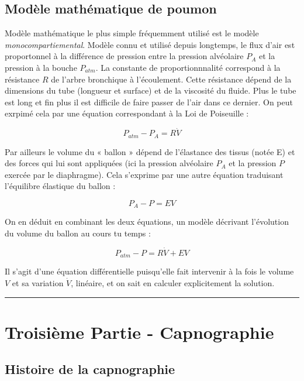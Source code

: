 \documentclass[12pt,]{article}
\begin{document}
\hypertarget{moduxe8le-mathuxe9matique-de-poumon}{%
\subsection{Modèle mathématique de
poumon}\label{moduxe8le-mathuxe9matique-de-poumon}}

Modèle mathématique le plus simple fréquemment utilisé est le modèle
\emph{monocompartiemental}. Modèle connu et utilisé depuis longtemps, le
flux d'air est proportonnel à la différence de pression entre la
pression alvéolaire \(P_{A}\) et la pression à la bouche \(P_{atm}\). La
constante de proportionnnalité correspond à la résistance \(R\) de
l'arbre bronchique à l'écoulement. Cette résistance dépend de la
dimensions du tube (longueur et surface) et de la viscosité du fluide.
Plus le tube est long et fin plus il est difficile de faire passer de
l'air dans ce dernier. On peut exrpimé cela par une équation
correspondant à la Loi de Poiseuille :

\[ P_{atm}-P_{A}=R\dot{V} \]

Par ailleurs le volume du « ballon » dépend de l'élastance des tissus
(notée E) et des forces qui lui sont appliquées (ici la pression
alvéolaire \(P_{A}\) et la pression \(P\) exercée par le diaphragme).
Cela s'exprime par une autre équation traduisant l'équilibre élastique
du ballon :

\[ P_{A}-P=EV \]

On en déduit en combinant les deux équations, un modèle décrivant
l'évolution du volume du ballon au cours tu temps :

\[ P_{atm}-P=R \dot{V}+EV \]

Il s'agit d'une équation différentielle puisqu'elle fait intervenir à la
fois le volume \(V\) et sa variation \(\dot{V}\), linéaire, et on sait
en calculer explicitement la solution.

\pagebreak

\begin{center}\rule{0.5\linewidth}{0.5pt}\end{center}

\hypertarget{troisiuxe8me-partie---capnographie}{%
\section{Troisième Partie -
Capnographie}\label{troisiuxe8me-partie---capnographie}}

\hypertarget{histoire-de-la-capnographie}{%
\subsection{Histoire de la
capnographie}\label{histoire-de-la-capnographie}}
\end{document}
